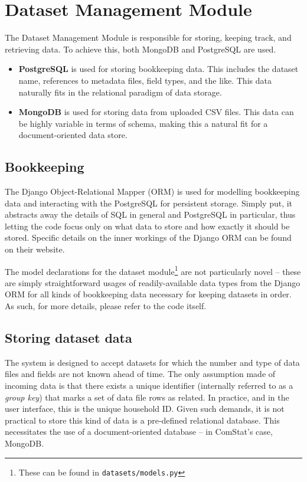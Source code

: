 
\section{Dataset Management Module}

The Dataset Management Module is responsible for storing, keeping track, and retrieving data. To achieve this, both MongoDB and PostgreSQL are used.

\begin{itemize}
\item \textbf{PostgreSQL} is used for storing bookkeeping data. This includes the dataset name, references to metadata files, field types, and the like. This data naturally fits in the relational paradigm of data storage.
\item \textbf{MongoDB} is used for storing data from uploaded CSV files. This data can be highly variable in terms of schema, making this a natural fit for a document-oriented data store.
\end{itemize}


\subsection{Bookkeeping}

The Django Object-Relational Mapper (ORM) is used for modelling bookkeeping data and interacting with the PostgreSQL for persistent storage. Simply put, it abstracts away the details of SQL in general and PostgreSQL in particular, thus letting the code focus only on what data to store and how exactly it should be stored. Specific details on the inner workings of the Django ORM can be found on their website.

The model declarations for the dataset module\footnote{These can be found in \texttt{datasets/models.py}} are not particularly novel -- these are simply straightforward usages of readily-available data types from the Django ORM for all kinds of bookkeeping data necessary for keeping datasets in order. As such, for more details, please refer to the code itself.


\subsection{Storing dataset data}

The system is designed to accept datasets for which the number and type of data files and fields are not known ahead of time. The only assumption made of incoming data is that there exists a unique identifier (internally referred to as a \emph{group key}) that marks a set of data file rows as related. In practice, and in the user interface, this is the unique household ID. Given such demands, it is not practical to store this kind of data is a pre-defined relational database. This necessitates the use of a document-oriented database -- in ComStat's case, MongoDB.

